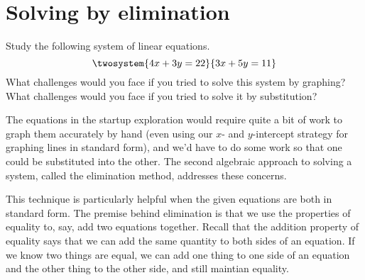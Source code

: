 %
%
%

\section{Solving by elimination}
\label{sec:syselimination}

\begin{boxexplore}
Study the following system of linear equations.
\[\twosystem{4x+3y=22}{3x+5y=11}\]
What challenges would you face if you tried to solve this system by graphing? What challenges would you face if you tried to solve it by substitution?
\end{boxexplore}

The equations in the startup exploration would require quite a bit of work to graph them accurately by hand (even using our $x$- and $y$-intercept strategy for graphing lines in standard form), and we'd have to do some work so that one could be substituted into the other. The second algebraic approach to solving a system, called the \gls{elimination method}, addresses these concerns.

This technique is particularly helpful when the given equations are both in standard form. The premise behind elimination is that we use the properties of equality to, say, add two equations together. Recall that the addition property of equality says that we can add the same quantity to both sides of an equation. If we know two things are equal, we can add one thing to one side of an equation and the other thing to the other side, and still maintian equality.

